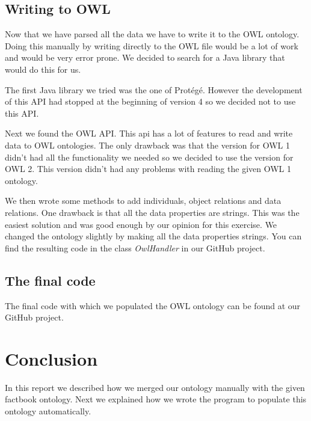 \documentclass{article}
\begin{document}
\subsection{Writing to OWL}
\label{sec:writ_owl}
Now that we have parsed all the data we have to write it to the OWL ontology. Doing this manually by writing directly to the OWL file would be a lot of work and would be very error prone. We decided to search for a Java library that would do this for us.\par
The first Java library we tried was the one of Prot\'eg\'e. However the development of this API had stopped at the beginning of version 4 so we decided not to use this API.\par
Next we found the OWL API\cite{owlapi}. This api has a lot of features to read and write data to OWL ontologies. The only drawback was that the version for OWL 1 didn't had all the functionality we needed so we decided to use the version for OWL 2. This version didn't had any problems with reading the given OWL 1 ontology.\par
We then wrote some methods to add individuals, object relations and data relations. One drawback is that all the data properties are strings. This was the easiest solution and was good enough by our opinion for this exercise. We changed the ontology slightly by making all the data properties strings. You can find the resulting code in the class \textit{OwlHandler} in our GitHub project\cite{githubproject}.
\subsection{The final code}
The final code with which we populated the OWL ontology can be found at our GitHub project\cite{githubproject}.
\section{Conclusion}
In this report we described how we merged our ontology manually with the given factbook ontology. Next we explained how we wrote the program to populate this ontology automatically.
\printbibliography
\end{document}
